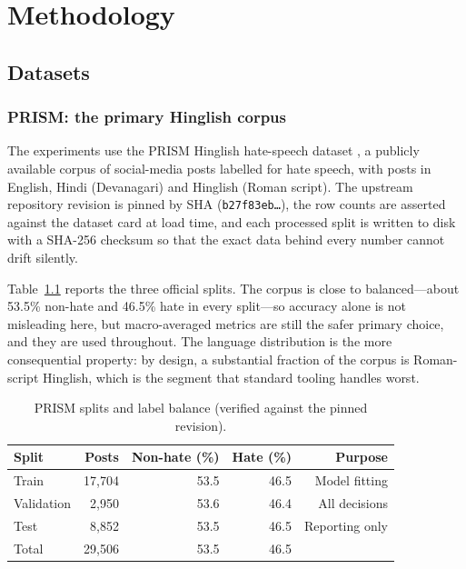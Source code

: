 \chapter{Methodology}
\label{ch:method}

\section{Datasets}
\label{sec:data}

\subsection{PRISM: the primary Hinglish corpus}
The experiments use the PRISM Hinglish hate-speech dataset \cite{prism}, a
publicly available corpus of social-media posts labelled for hate speech, with
posts in English, Hindi (Devanagari) and Hinglish (Roman script). The upstream
repository revision is pinned by SHA (\texttt{b27f83eb\ldots}), the row counts are
asserted against the dataset card at load time, and each processed split is
written to disk with a SHA-256 checksum so that the exact data behind every
number cannot drift silently.

Table~\ref{tab:prism} reports the three official splits. The corpus is close to
balanced---about 53.5\% non-hate and 46.5\% hate in every split---so accuracy
alone is not misleading here, but macro-averaged metrics are still the safer
primary choice, and they are used throughout. The language distribution is the
more consequential property: by design, a substantial fraction of the corpus is
Roman-script Hinglish, which is the segment that standard tooling handles worst.

\begin{table}[htbp]
\centering
\caption[PRISM splits and label balance]{PRISM splits and label balance (verified against the pinned revision).}
\label{tab:prism}
\small
\begin{tabular}{lrrrr}
\toprule
Split & Posts & Non-hate (\%) & Hate (\%) & Purpose \\
\midrule
Train & 17{,}704 & 53.5 & 46.5 & Model fitting \\
Validation & 2{,}950 & 53.6 & 46.4 & All decisions \\
Test & 8{,}852 & 53.5 & 46.5 & Reporting only \\
\midrule
Total & 29{,}506 & 53.5 & 46.5 & \\
\bottomrule
\end{tabular}
\end{table}

